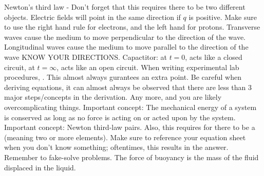 \markdownRendererInterblockSeparator
{}\markdownRendererUlBeginTight
\markdownRendererUlItem Newton's third law - Don't forget that this requires there to be two different objects.\markdownRendererUlItemEnd 
\markdownRendererUlItem Electric fields will point in the same direction if $q$ is positive.\markdownRendererUlItemEnd 
\markdownRendererUlItem Make sure to use the right hand rule for electrons, and the left hand for protons.\markdownRendererUlItemEnd 
\markdownRendererUlItem Transverse waves cause the medium to move perpendicular to the direction of the wave.\markdownRendererUlItemEnd 
\markdownRendererUlItem Longitudinal waves cause the medium to move parallel to the direction of the wave\markdownRendererUlItemEnd 
\markdownRendererUlItem KNOW YOUR DIRECTIONS.\markdownRendererUlItemEnd 
\markdownRendererUlItem Capactitor: at $t=0$, acts like a closed circuit, at $t=\infty$, acts like an open circuit.\markdownRendererUlItemEnd 
\markdownRendererUlEndTight \markdownRendererInterblockSeparator
{}\markdownRendererInterblockSeparator
{}\markdownRendererUlBeginTight
\markdownRendererUlItem When writing experimental lab procedures, . This almost always gurantees an extra point.\markdownRendererUlItemEnd 
\markdownRendererUlItem Be careful when deriving equations, it can almost always be observed that there are less than 3 major steps/concepts in the derivation. Any more, and you are likely overcomplicating things.\markdownRendererUlItemEnd 
\markdownRendererUlItem Important concept: The mechanical energy of a system is conserved as long as no force is acting on or acted upon by the system.\markdownRendererUlItemEnd 
\markdownRendererUlItem Important concept: Newton third-law pairs. Also, this requires for there to be a  (meaning two or more elements).\markdownRendererUlItemEnd 
\markdownRendererUlItem Make sure to reference your equation sheet when you don't know something; oftentimes, this results in the answer.\markdownRendererUlItemEnd 
\markdownRendererUlItem Remember to fake-solve problems.\markdownRendererUlItemEnd 
\markdownRendererUlEndTight \markdownRendererInterblockSeparator
{}\markdownRendererInterblockSeparator
{}\markdownRendererUlBeginTight
\markdownRendererUlItem The force of buoyancy is the mass of the fluid displaced in the liquid.\markdownRendererUlItemEnd 
\markdownRendererUlEndTight \markdownRendererInterblockSeparator
